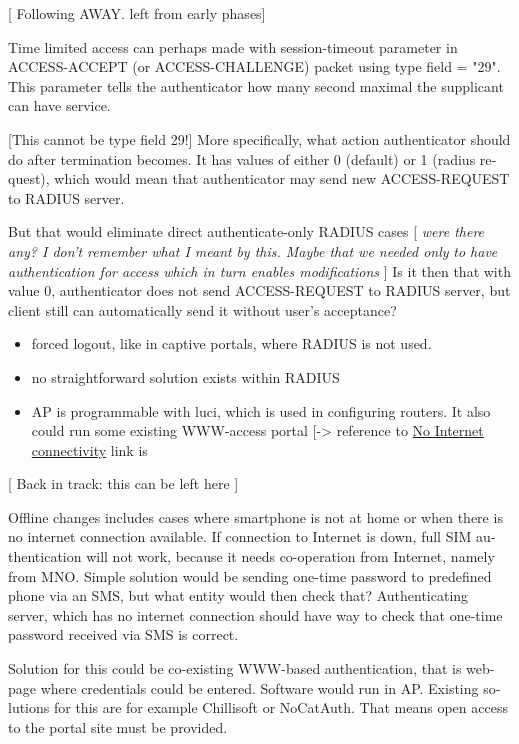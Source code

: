 \documentclass[12pt,a4paper,english]{tutthesis}
\begin{document}
\begin{otherlanguage}{english}
[ Following AWAY. left from early phases]

Time limited access can perhaps made with session-timeout parameter
in ACCESS-ACCEPT (or ACCESS-CHALLENGE) packet using type field = "29".
This parameter tells the authenticator how many second maximal the supplicant
can have service. 

[This cannot be type field 29!]  More specifically, what action
authenticator should do after termination becomes. It has values of
either 0 (default) or 1 (radius request), which would mean that
authenticator may send new ACCESS-REQUEST to RADIUS server.

But that would eliminate direct authenticate-only RADIUS cases
  [ \emph{were there}
 \emph{any? I don't remember what I meant}
 \emph{by this. Maybe that we needed only}
 \emph{to have authentication for access} 
 \emph{which in turn enables modifications} ]
Is it then that with value 0, authenticator does not send
ACCESS-REQUEST to RADIUS server, but client still can automatically send it without 
user's acceptance?
\begin{itemize}
\item forced logout, like in captive portals, where RADIUS is not used.
\item no straightforward solution exists within RADIUS
\item AP is programmable with luci, which is used in configuring routers. It also could run some existing WWW-access
portal [-> reference to \hyperref[text:nointernet]{No Internet connectivity} link is
\end{itemize}








[ Back in track: this can be left here ]

Offline changes includes cases where smartphone is not at home or when
there is no internet connection available.
If connection to Internet is down, full SIM authentication will not
work, because it needs co-operation from Internet, namely from MNO.
Simple solution would be sending one-time password to predefined
phone via an SMS, but what entity would then check that?
Authenticating server, which has no internet connection should 
have way to check that one-time password received via SMS is correct.

Solution for this could be co-existing WWW-based authentication, that
is web-page where credentials could be entered.
Software would run in AP. Existing solutions for this are for example
Chillisoft or NoCatAuth. That means open access to the
portal site must be provided.



\end{otherlanguage}
\end{document}
